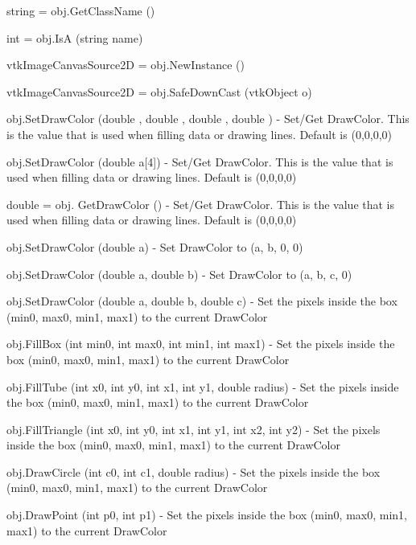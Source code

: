 \begin{DoxyItemize}
\item {\ttfamily string = obj.\-Get\-Class\-Name ()}  
\item {\ttfamily int = obj.\-Is\-A (string name)}  
\item {\ttfamily vtk\-Image\-Canvas\-Source2\-D = obj.\-New\-Instance ()}  
\item {\ttfamily vtk\-Image\-Canvas\-Source2\-D = obj.\-Safe\-Down\-Cast (vtk\-Object o)}  
\item {\ttfamily obj.\-Set\-Draw\-Color (double , double , double , double )} -\/ Set/\-Get Draw\-Color. This is the value that is used when filling data or drawing lines. Default is (0,0,0,0)  
\item {\ttfamily obj.\-Set\-Draw\-Color (double a\mbox{[}4\mbox{]})} -\/ Set/\-Get Draw\-Color. This is the value that is used when filling data or drawing lines. Default is (0,0,0,0)  
\item {\ttfamily double = obj. Get\-Draw\-Color ()} -\/ Set/\-Get Draw\-Color. This is the value that is used when filling data or drawing lines. Default is (0,0,0,0)  
\item {\ttfamily obj.\-Set\-Draw\-Color (double a)} -\/ Set Draw\-Color to (a, b, 0, 0)  
\item {\ttfamily obj.\-Set\-Draw\-Color (double a, double b)} -\/ Set Draw\-Color to (a, b, c, 0)  
\item {\ttfamily obj.\-Set\-Draw\-Color (double a, double b, double c)} -\/ Set the pixels inside the box (min0, max0, min1, max1) to the current Draw\-Color  
\item {\ttfamily obj.\-Fill\-Box (int min0, int max0, int min1, int max1)} -\/ Set the pixels inside the box (min0, max0, min1, max1) to the current Draw\-Color  
\item {\ttfamily obj.\-Fill\-Tube (int x0, int y0, int x1, int y1, double radius)} -\/ Set the pixels inside the box (min0, max0, min1, max1) to the current Draw\-Color  
\item {\ttfamily obj.\-Fill\-Triangle (int x0, int y0, int x1, int y1, int x2, int y2)} -\/ Set the pixels inside the box (min0, max0, min1, max1) to the current Draw\-Color  
\item {\ttfamily obj.\-Draw\-Circle (int c0, int c1, double radius)} -\/ Set the pixels inside the box (min0, max0, min1, max1) to the current Draw\-Color  
\item {\ttfamily obj.\-Draw\-Point (int p0, int p1)} -\/ Set the pixels inside the box (min0, max0, min1, max1) to the current Draw\-Color  

\end{DoxyItemize}
